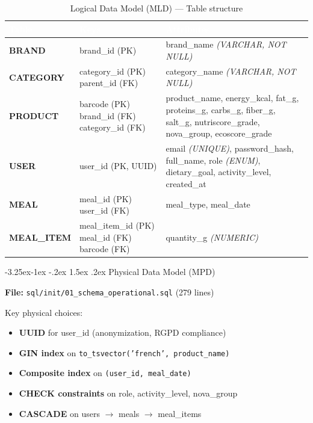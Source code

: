 \documentclass[a4paper,11pt,oneside,openany]{report}
\makeatletter
\renewcommand\subsection{\@startsection{subsection}{2}{\z@}%
  {-3.25ex\@plus -1ex \@minus -.2ex}%
  {1.5ex \@plus .2ex}%
  {\normalfont\large\bfseries\color{ntdarkgreen}}}
\newcommand{\rgpd}{RGPD}
\makeatother
\begin{document}
\begin{table}[H]
\centering
\caption{Logical Data Model (MLD) --- Table structure}
\label{tab:mld}
\begin{tabularx}{\textwidth}{>{\ttfamily\bfseries}l L{3cm} X}
\toprule
{}
\textcolor{white}{\textbf{Table}} & \textcolor{white}{\textbf{Keys}} & \textcolor{white}{\textbf{Attributes}} \\
\midrule
BRAND & brand\_id (PK) & brand\_name \textit{(VARCHAR, NOT NULL)} \\
CATEGORY & category\_id (PK) \newline parent\_id (FK) & category\_name \textit{(VARCHAR, NOT NULL)} \\
PRODUCT & barcode (PK) \newline brand\_id (FK) \newline category\_id (FK) & product\_name, energy\_kcal, fat\_g, proteins\_g, carbs\_g, fiber\_g, salt\_g, nutriscore\_grade, nova\_group, ecoscore\_grade \\
USER & user\_id (PK, UUID) & email \textit{(UNIQUE)}, password\_hash, full\_name, role \textit{(ENUM)}, dietary\_goal, activity\_level, created\_at \\
MEAL & meal\_id (PK) \newline user\_id (FK) & meal\_type, meal\_date \\
MEAL\_ITEM & meal\_item\_id (PK) \newline meal\_id (FK) \newline barcode (FK) & quantity\_g \textit{(NUMERIC)} \\
\bottomrule
\end{tabularx}
\end{table}

\subsection{Physical Data Model (MPD)}

\textbf{File:} \texttt{sql/init/01\_schema\_operational.sql} (279 lines)

Key physical choices:
\begin{itemize}[nosep]
  \item \textbf{UUID} for user\_id (anonymization, \rgpd{} compliance)
  \item \textbf{GIN index} on \texttt{to\_tsvector('french', product\_name)}
  \item \textbf{Composite index} on \texttt{(user\_id, meal\_date)}
  \item \textbf{CHECK constraints} on role, activity\_level, nova\_group
  \item \textbf{CASCADE} on users $\rightarrow$ meals $\rightarrow$ meal\_items
\end{itemize}
\end{document}
